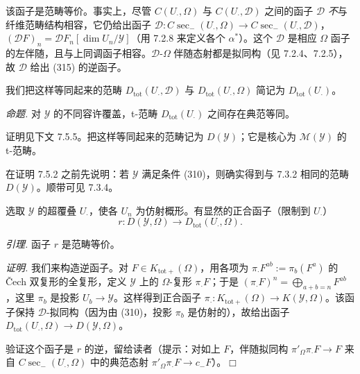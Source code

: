 该函子是范畴等价。事实上，尽管 $C(U_{\cdot},\Omega)$ 与 $C(U_{\cdot},\mathcal{D})$ 之间的函子 $\mathcal{D}$ \emph{不}与纤维范畴结构相容，它仍给出函子 $\mathcal{D}:C\sec_{-}(U_{\cdot},\Omega)\to C\sec_{-}(U_{\cdot},\mathcal{D})$，$(\mathcal{D}F)_{n}=\mathcal{D}F_{n}[\dim U_{n}/\mathcal{Y}]$（用 7.2.8 来定义各个 $\alpha^{*}$）。这个 $\mathcal{D}$ 是相应 $\Omega$ 函子的左伴随，且与上同调函子相容。$\mathcal{D}$-$\Omega$ 伴随态射都是拟同构（见 7.2.4、7.2.5），故 $\mathcal{D}$ 给出 (315) 的逆函子。


我们把这样等同起来的范畴 $D_{\mathrm{tot}}(U_{\cdot},\mathcal{D})$ 与 $D_{\mathrm{tot}}(U_{\cdot},\Omega)$ 简记为 $D_{\mathrm{tot}}(U_{\cdot})$。

 \emph{命题.} 对 $\mathcal{Y}$ 的不同容许覆盖，t-范畴 $D_{\mathrm{tot}}(U_{\cdot})$ 之间存在典范等同。

证明见下文 7.5.5。把这样等同起来的范畴记为 $D(\mathcal{Y})$；它是核心为 $\mathcal{M}(\mathcal{Y})$ 的 t-范畴。

在证明 7.5.2 之前先说明：若 $\mathcal{Y}$ 满足条件 (310)，则确实得到与 7.3.2 相同的范畴 $D(\mathcal{Y})$。顺带可见 7.3.4。

选取 $\mathcal{Y}$ 的超覆叠 $U_{\cdot}$，使各 $U_{n}$ 为仿射概形。有显然的正合函子（限制到 $U_{\cdot}$）
\begin{equation}\tag{316}
r:D(\mathcal{Y},\Omega)\to D_{\mathrm{tot}}(U_{\cdot},\Omega).
\end{equation}

 \emph{引理.} 函子 $r$ 是范畴等价。

\emph{证明.} 我们来构造逆函子。对 $F\in K_{\mathrm{tot}+}(\Omega)$，用各项为 $\pi_{\cdot}F^{ab}:=\pi_{b}(F^{a})$ 的 Čech 双复形的全复形，定义 $\mathcal{Y}$ 上的 $\Omega$-复形 $\pi_{\cdot}F$；于是 $(\pi_{\cdot}F)^{n}=\bigoplus_{a+b=n}F^{ab}$，这里 $\pi_{b}$ 是投影 $U_{b}\to\mathcal{Y}$。这样得到正合函子 $\pi_{\cdot}:K_{\mathrm{tot}+}(\Omega)\to K(\mathcal{Y},\Omega)$。该函子保持 $\mathcal{D}$-拟同构（因为由 (310)，投影 $\pi_{b}$ 是仿射的），故给出函子 $D_{\mathrm{tot}}(U_{\cdot},\Omega)\to D(\mathcal{Y},\Omega)$。

验证这个函子是 $r$ 的逆，留给读者（提示：对如上 $F$，伴随拟同构 $\pi'_{\Omega}\pi_{\cdot}F\to F$ 来自 $C\sec_{-}(U_{\cdot},\Omega)$ 中的典范态射 $\pi'_{\Omega}\pi_{\cdot}F\to c_{-}F$）。\hfill$\Box$

